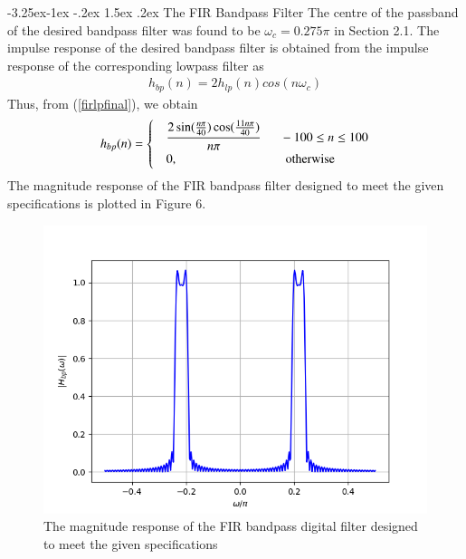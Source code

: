\documentclass[article]{IEEEtran}
\makeatletter
\theoremstyle{remark}
\numberwithin{equation}{subsection}
\renewcommand\subsection{\@startsection{subsection}{2}{\z@}%
    {-3.25ex\@plus -1ex \@minus -.2ex}%
    {1.5ex \@plus .2ex}%
    {\normalfont\large\bfseries}}
\makeatother
\begin{document}
\subsection{The FIR Bandpass Filter}
The centre of the passband of the desired bandpass filter was found to be $\omega_c = 0.275\pi$ in Section
2.1.  The impulse response of the desired bandpass filter is obtained from the impulse response of the
corresponding lowpass filter as
\begin{align}
h_{bp}(n) = 2h_{lp}(n)cos(n\omega_c)
\end{align}
Thus, from (\ref{firlpfinal}), we obtain
\begin{align}
h_{bp}(n) =
\begin{cases}
\label{firbpfinal}
& \dfrac{2\sin(\frac{n\pi}{40}) \cos(\frac{11n\pi}{40})}{n\pi} \indent -100 \leq n \leq 100 \nonumber \\
& 0, \hspace{3cm} \mbox{otherwise}
\end{cases}
\end{align}
The magnitude response of the FIR bandpass filter designed to meet the given specifications is plotted in Figure 6.
\begin{figure}[H]
\label{fig6}
\includegraphics[width = \columnwidth]{figs/fig6.png}
\caption{The magnitude response of the FIR bandpass digital filter designed to meet the given specifications} 
\end{figure}
\end{document}
